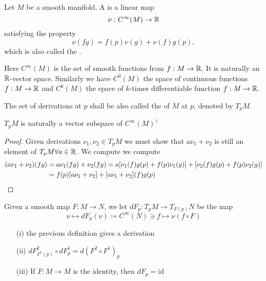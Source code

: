 \begin{definition*}
    Let \(M\) be a smooth manifold. A  is a linear map 
    \[\nu:C^\infty(M)\to\mathbb{R}\]
    satisfying the property 
    \begin{equation}\label{eq:leibniz}\nu(fg)=f(p)\nu(g)+\nu(f)g(p),\end{equation}
    which is also called the .
\end{definition*}
\begin{remark}
    Here \(C^\infty(M)\) is the set of smooth functions from \(f:M\to\mathbb{R}\). It is naturally an \(\mathbb{R}\)-vector space. 
    Similarly we have \(C^0(M)\) the space of continuous functions \(f: M \to \mathbb{R}\) and \(C^k(M)\) the space of \(k\)-times differentiable function \(f:M\to\mathbb{R}\).
\end{remark}
\begin{definition*}
    The set of derivations at \(p\) shall be also called the  of \(M\) at \(p\), denoted by \(T_pM\).
\end{definition*}

\begin{lemma}\label{lem:3.4}
    \(T_pM\) is naturally a vector subspace of \(C^\infty(M)^\vee\)
\end{lemma}
\begin{proof}
    Given derivations \(\nu_1,\nu_2\in T_pM\) we must show that \(a\nu_1+\nu_2\) is still 
    an element of \(T_pM\forall a\in\mathbb{R}\). We compute we compute
    \begin{align*}
        (a\nu_1+\nu_2)(fg)&=a\nu_1(fg)+\nu_2(fg)=a[\nu_1(f)g(p)+f(p)\nu_1(g)]+[\nu_2(f)g(p)+f(p)\nu_2(g)] \\
        &= f(p)[a\nu_1+\nu_2]+[a\nu_1+\nu_2](f)g(p)\qedhere
    \end{align*} 
\end{proof}

\begin{definition*}
    Given a smooth map \(F:M\to N\), we let \(dF_p:T_pM\to T_{F(p)}N\) be the map 
    \[\nu\mapsto dF_p(\nu)\coloneqq C^\infty(N)\ni f\mapsto \nu(f\circ F)\]
\end{definition*}

\begin{lemma}\label{lem:3.5}
    \begin{enumerate}
        \item[(i)] the previous definition gives a derivation 
        \item[(ii)]\(dF^2_{F^1(p)}\circ dF_p^1=d(F^2\circ F^1)_p\)
        \item[(iii)] If \(F:M\to M\) is the identity, then \(dF_p=\text{id}\)  
    \end{enumerate}
\end{lemma}

